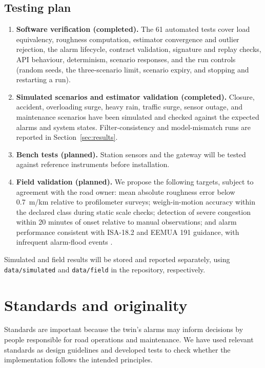 \documentclass[11pt,a4paper]{article}
\newcommand{\code}[1]{\texttt{#1}}
\begin{document}
\subsection{Testing plan}
\begin{enumerate}
\item \textbf{Software verification (completed).} The 61 automated tests cover load equivalency, roughness computation, estimator convergence and outlier rejection, the alarm lifecycle, contract validation, signature and replay checks, API behaviour, determinism, scenario responses, and the run controls (random seeds, the three-scenario limit, scenario expiry, and stopping and restarting a run).
\item \textbf{Simulated scenarios and estimator validation (completed).} Closure, accident, overloading surge, heavy rain, traffic surge, sensor outage, and maintenance scenarios have been simulated and checked against the expected alarms and system states. Filter-consistency and model-mismatch runs are reported in Section~\ref{sec:results}.
\item \textbf{Bench tests (planned).} Station sensors and the gateway will be tested against reference instruments before installation.
\item \textbf{Field validation (planned).} We propose the following targets, subject to agreement with the road owner: mean absolute roughness error below 0.7~m/km relative to profilometer surveys; weigh-in-motion accuracy within the declared class during static scale checks; detection of severe congestion within 20 minutes of onset relative to manual observations; and alarm performance consistent with ISA-18.2 and EEMUA 191 guidance, with infrequent alarm-flood events \cite{eemua191}.
\end{enumerate}

Simulated and field results will be stored and reported separately, using \code{data/simulated} and \code{data/field} in the repository, respectively.

\section{Standards and originality}\label{sec:standards}
Standards are important because the twin's alarms may inform decisions by people responsible for road operations and maintenance. We have used relevant standards as design guidelines and developed tests to check whether the implementation follows the intended principles.
\end{document}
